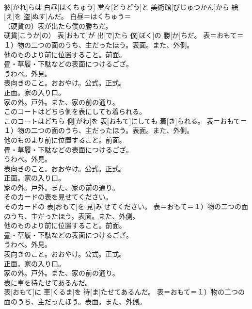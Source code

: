 \documentclass[8pt]{extreport}
\begin{document}
\begin{CJK}{UTF8}{min}
{\\	彼[かれ]らは 白昼[はくちゅう] 堂々[どうどう]と 美術館[びじゅつかん]から 絵[え]を 盗[ぬす]んだ。	白昼＝はくちゅう＝ 
\\	（硬貨の）表が出たら僕の勝ちだ。	
\\	硬貨[こうか]の） 表[おもて]が 出[で]たら 僕[ぼく]の 勝[か]ちだ。	表＝おもて＝１）物の二つの面のうち、主だったほう。表面。また、外側。 　　　　　　
\\	他のものより前に位置すること。前面。 　　　　　　
\\	畳・草履・下駄などの表面につけるござ。 　　　　　　
\\	うわべ。外見。 　　　　　　
\\	表向きのこと。おおやけ。公式。正式。 　　　　　　
\\	正面。家の入り口。 　　　　　　
\\	家の外。戸外。また、家の前の通り。
\\	このコートはどちら側を表にしても着られる。	
\\	このコートはどちら 側[がわ]を 表[おもて]にしても 着[き]られる。	表＝おもて＝１）物の二つの面のうち、主だったほう。表面。また、外側。 　　　　　　
\\	他のものより前に位置すること。前面。 　　　　　　
\\	畳・草履・下駄などの表面につけるござ。 　　　　　　
\\	うわべ。外見。 　　　　　　
\\	表向きのこと。おおやけ。公式。正式。 　　　　　　
\\	正面。家の入り口。 　　　　　　
\\	家の外。戸外。また、家の前の通り。
\\	そのカードの表を見せてください。	
\\	そのカードの 表[おもて]を 見[み]せてください。	表＝おもて＝１）物の二つの面のうち、主だったほう。表面。また、外側。 　　　　　　
\\	他のものより前に位置すること。前面。 　　　　　　
\\	畳・草履・下駄などの表面につけるござ。 　　　　　　
\\	うわべ。外見。 　　　　　　
\\	表向きのこと。おおやけ。公式。正式。 　　　　　　
\\	正面。家の入り口。 　　　　　　
\\	家の外。戸外。また、家の前の通り。
\\	表に車を待たせてあるんだ。	
\\	表[おもて]に 車[くるま]を 待[ま]たせてあるんだ。	表＝おもて＝１）物の二つの面のうち、主だったほう。表面。また、外側。 　　　　　　
}
\end{CJK}
\end{document}
